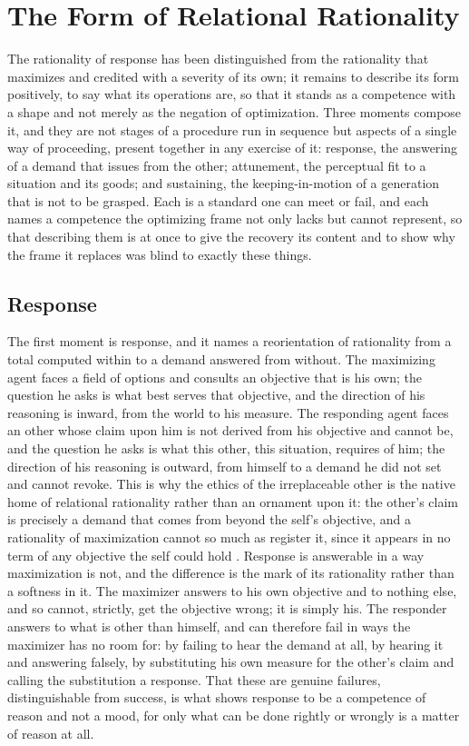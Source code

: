 \section{The Form of Relational Rationality}
\label{p25:sec:form}

\noindent
The rationality of response has been distinguished from the rationality that maximizes and credited with a severity of its own; it remains to describe its form positively, to say what its operations are, so that it stands as a competence with a shape and not merely as the negation of optimization. Three moments compose it, and they are not stages of a procedure run in sequence but aspects of a single way of proceeding, present together in any exercise of it: response, the answering of a demand that issues from the other; attunement, the perceptual fit to a situation and its goods; and sustaining, the keeping-in-motion of a generation that is not to be grasped. Each is a standard one can meet or fail, and each names a competence the optimizing frame not only lacks but cannot represent, so that describing them is at once to give the recovery its content and to show why the frame it replaces was blind to exactly these things.

\subsection*{Response}

The first moment is response, and it names a reorientation of rationality from a total computed within to a demand answered from without. The maximizing agent faces a field of options and consults an objective that is his own; the question he asks is what best serves that objective, and the direction of his reasoning is inward, from the world to his measure. The responding agent faces an other whose claim upon him is not derived from his objective and cannot be, and the question he asks is what this other, this situation, requires of him; the direction of his reasoning is outward, from himself to a demand he did not set and cannot revoke. This is why the ethics of the irreplaceable other is the native home of relational rationality rather than an ornament upon it: the other's claim is precisely a demand that comes from beyond the self's objective, and a rationality of maximization cannot so much as register it, since it appears in no term of any objective the self could hold \parencite{levinas1969totality}. Response is answerable in a way maximization is not, and the difference is the mark of its rationality rather than a softness in it. The maximizer answers to his own objective and to nothing else, and so cannot, strictly, get the objective wrong; it is simply his. The responder answers to what is other than himself, and can therefore fail in ways the maximizer has no room for: by failing to hear the demand at all, by hearing it and answering falsely, by substituting his own measure for the other's claim and calling the substitution a response. That these are genuine failures, distinguishable from success, is what shows response to be a competence of reason and not a mood, for only what can be done rightly or wrongly is a matter of reason at all.

